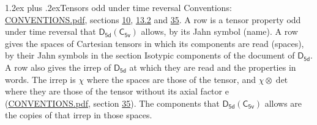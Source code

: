 \documentclass[10pt,a4paper]{article}
\makeatletter
\renewcommand\section{\@startsection{section}{1}{\z@}{-3ex plus -1ex minus -.2ex}%
  {1.2ex plus .2ex}{\normalfont\large\sffamily\bfseries\color{parttitle}}}
\numberwithin{equation}{section}
\newcommand{\grp}[1]{\mathsf{#1}}
\newcommand{\irrprod}{\otimes}
\makeatother
\begin{document}
\section{Tensors odd under time reversal}\label{s:time_odd}
Conventions: \href{../../CONVENTIONS.pdf}{CONVENTIONS.pdf}, sections \href{../../../rotation/CONVENTIONS.pdf\#conv.10}{10}, \href{../../../rotation/CONVENTIONS.pdf\#conv.13.2}{13.2} and \href{../../CONVENTIONS.pdf\#conv.35}{35}.
\leavevmode\label{n:head.name.property}A row is a tensor property odd under time reversal that $\grp{D_{5d}}(\grp{C_{5v}})$ allows, by its Jahn symbol (name). \label{n:head.spaces}A row gives the spaces of Cartesian tensors in which its components are read (spaces), by their Jahn symbols in the section Isotypic components of the document of \href{../../../rotation/data/pdf/D5d.pdf}{$\grp{D_{5d}}$}. \label{n:head.properties}A row also gives the irrep of $\grp{D_{5d}}$ at which they are read and the properties in words. The irrep is $\chi$ where the spaces are those of the tensor, and $\chi \irrprod \det$ where they are those of the tensor without its axial factor e (\href{../../CONVENTIONS.pdf}{CONVENTIONS.pdf}, section \href{../../CONVENTIONS.pdf\#conv.35}{35}). The components that $\grp{D_{5d}}(\grp{C_{5v}})$ allows are the copies of that irrep in those spaces.
\end{document}
